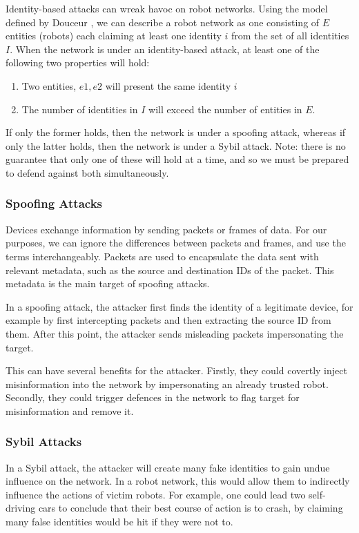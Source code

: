 Identity-based attacks can wreak havoc on robot networks. Using the model defined by Douceur \cite{SybilAttack}, we can describe a robot network as one consisting of $E$ entities (robots) each claiming at least one identity $i$ from the set of all identities $I$. When the network is under an identity-based attack, at least one of the following two properties will hold: %
\begin{enumerate}
    \item Two entities, $e1, e2$ will present the same identity $i$
    \item The number of identities in $I$ will exceed the number of entities in $E$.
\end{enumerate}
If only the former holds, then the network is under a spoofing attack, whereas if only the latter holds, then the network is under a Sybil attack. Note: there is no guarantee that only one of these will hold at a time, and so we must be prepared to defend against both simultaneously.

\subsubsection{Spoofing Attacks}
Devices exchange information by sending packets or frames of data. For our purposes, we can ignore the differences between packets and frames, and use the terms interchangeably. Packets are used to encapsulate the data sent with relevant metadata, such as the source and destination IDs of the packet. This metadata is the main target of spoofing attacks.

In a spoofing attack, the attacker first finds the identity of a legitimate device, for example by first intercepting packets and then extracting the source ID from them. After this point, the attacker sends misleading packets impersonating the target. 

This can have several benefits for the attacker. Firstly, they could covertly inject misinformation into the network by impersonating an already trusted robot. Secondly, they could trigger defences in the network to flag target for misinformation and remove it.

\subsubsection{Sybil Attacks}
In a Sybil attack, the attacker will create many fake identities to gain undue influence on the network. In a robot network, this would allow them to indirectly influence the actions of victim robots. For example, one could lead two self-driving cars to conclude that their best course of action is to crash, by claiming many false identities would be hit if they were not to.

